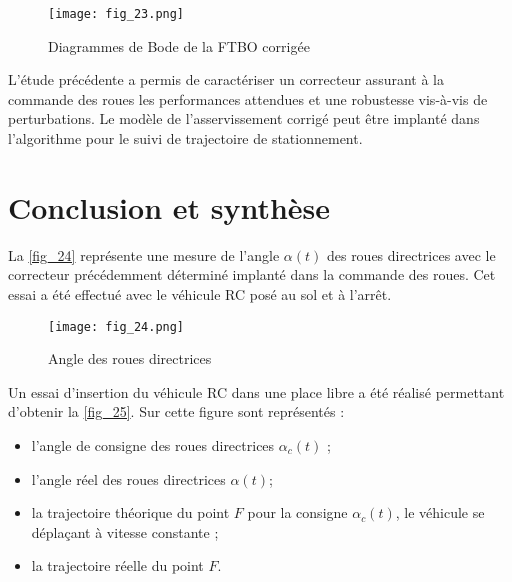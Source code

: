 \begin{figure}[H]
\centering
\texttt{[image: fig\_23.png]}
\caption{Diagrammes de Bode de la FTBO corrigée \label{fig_23}}
\end{figure}


L’étude précédente a permis de caractériser un correcteur assurant à la commande des roues les performances
attendues et une robustesse vis-à-vis de perturbations. Le modèle de l’asservissement corrigé peut être implanté
dans l’algorithme pour le suivi de trajectoire de stationnement.


\section{Conclusion et synthèse}

La \autoref{fig_24} représente une mesure de l’angle $\alpha(t)$ des roues directrices avec le correcteur précédemment déterminé implanté dans la commande des roues. Cet essai a été effectué avec le véhicule RC posé au sol et à l’arrêt.

\begin{figure}[H]
\centering
\texttt{[image: fig\_24.png]}
\caption{Angle des roues directrices \label{fig_24}}
\end{figure}


Un essai d’insertion du véhicule RC dans une place libre a été réalisé permettant d’obtenir la  \autoref{fig_25}. Sur
cette figure sont représentés :
\begin{itemize}
\item l’angle de consigne des roues directrices $\alpha_c(t)$ ;
\item l’angle réel des roues directrices $\alpha(t)$;
\item la trajectoire théorique du point $F$ pour la consigne $\alpha_c(t)$, le véhicule se déplaçant à vitesse constante ;
\item la trajectoire réelle du point $F$.
\end{itemize}



